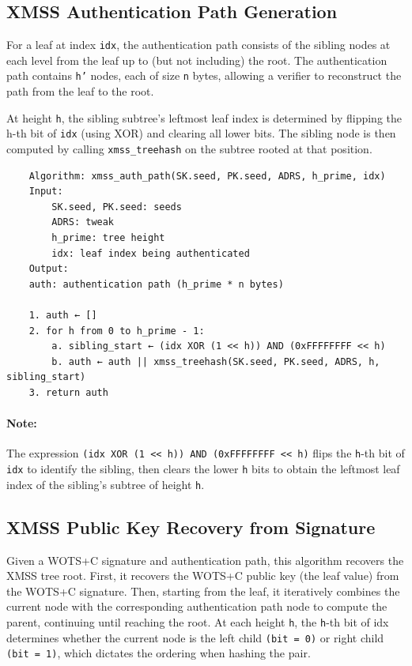 \subsection{XMSS Authentication Path Generation}
For a leaf at index \texttt{idx}, the authentication path consists of the sibling nodes at each level from the leaf up to (but not including) the root. The authentication path contains \texttt{h'} nodes, each of size \texttt{n} bytes, allowing a verifier to reconstruct the path from the leaf to the root.

At height \texttt{h}, the sibling subtree's leftmost leaf index is determined by flipping the h-th bit of \texttt{idx} (using XOR) and clearing all lower bits. The sibling node is then computed by calling \texttt{xmss\_treehash} on the subtree rooted at that position.
\begin{verbatim}
    Algorithm: xmss_auth_path(SK.seed, PK.seed, ADRS, h_prime, idx)
    Input:
        SK.seed, PK.seed: seeds
        ADRS: tweak
        h_prime: tree height
        idx: leaf index being authenticated
    Output:
    auth: authentication path (h_prime * n bytes)

    1. auth ← []
    2. for h from 0 to h_prime - 1:
        a. sibling_start ← (idx XOR (1 << h)) AND (0xFFFFFFFF << h)
        b. auth ← auth || xmss_treehash(SK.seed, PK.seed, ADRS, h, sibling_start)
    3. return auth
\end{verbatim}
\paragraph{Note:} The expression \texttt{(idx XOR (1 << h)) AND (0xFFFFFFFF << h)} flips the \texttt{h}-th bit of \texttt{idx} to identify the sibling, then clears the lower \texttt{h} bits to obtain the leftmost leaf index of the sibling's subtree of height \texttt{h}.

\subsection{XMSS Public Key Recovery from Signature}
Given a WOTS+C signature and authentication path, this algorithm recovers the XMSS tree root. First, it recovers the WOTS+C public key (the leaf value) from the WOTS+C signature. Then, starting from the leaf, it iteratively combines the current node with the corresponding authentication path node to compute the parent, continuing until reaching the root. At each height \texttt{h}, the \texttt{h}-th bit of idx determines whether the current node is the left child \texttt{(bit = 0)} or right child \texttt{(bit = 1)}, which dictates the ordering when hashing the pair.

